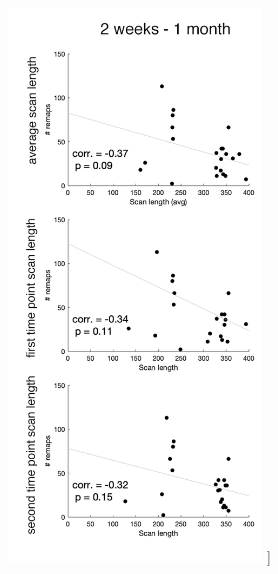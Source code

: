 \documentclass[phd,tocprelim]{cornell}
\renewcommand{\caption}[1]{\singlespacing\hangcaption{#1}\normalspacing}
\begin{document}
\vfill
\clearpage
\null
\vfill
\begin{figure}[h!]
		\ContinuedFloat
		\captionsetup{labelformat=adja-page}
    \centering
    \includegraphics[width=0.6\textwidth]{chapter1/SupplementaryFigure4B.png}
    \caption[]{}
\end{figure}
\null
\vfill
\clearpage
\null
\vfill
\end{document}
